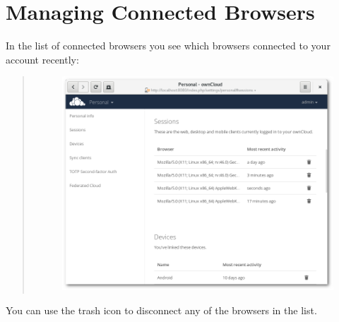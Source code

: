 \documentclass[letterpaper,10pt,english]{sphinxmanual}
\begin{document}
\section{Managing Connected Browsers}
\label{session_management:managing-connected-browsers}
In the list of connected browsers you see which browsers connected to your
account recently:
\begin{quote}
\begin{figure}[htbp]
\centering

\includegraphics{settings_sessions.png}
\end{figure}
\end{quote}

You can use the trash icon to disconnect any of the browsers in the list.
\end{document}
